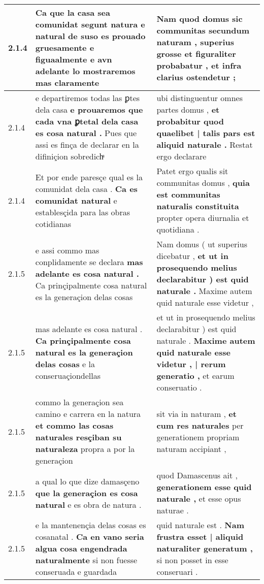\begin{tabular}{|p{1cm}|p{6.5cm}|p{6.5cm}|}
2.1.4 & Ca que la casa sea comunidat \textbf{ segunt natura e natural de suso es prouado gruesamente e figuaalmente } e avn adelante lo mostraremos mas claramente & Nam quod domus sic communitas secundum naturam , \textbf{ superius grosse et figuraliter probabatur , } et infra clarius ostendetur ; \\\hline
2.1.4 & e departiremos todas las ꝑtes dela casa \textbf{ e prouaremos que cada vna ꝑtetal dela casa es cosa natural . } Pues que assi es finça de declarar en la difiniçion sobredichͣ & ubi distinguentur omnes partes domus , \textbf{ et probabitur quod quaelibet | talis pars est aliquid naturale . } Restat ergo declarare \\\hline
2.1.4 & Et por ende paresçe qual es la comunidat dela casa . \textbf{ Ca es comunidat natural } e establesçida para las obras cotidianas & Patet ergo qualis sit communitas domus , \textbf{ quia est communitas naturalis constituita } propter opera diurnalia et quotidiana . \\\hline
2.1.5 & e assi commo mas conplidamente se declara \textbf{ mas adelante es cosa natural . } Ca prinçipalmente cosa natural es la generaçion delas cosas & Nam domus ( ut superius dicebatur , \textbf{ et ut in prosequendo melius declarabitur ) est quid naturale . } Maxime autem quid naturale esse videtur , \\\hline
2.1.5 & mas adelante es cosa natural . \textbf{ Ca prinçipalmente cosa natural es la generaçion delas cosas } e la conseruaçiondellas & et ut in prosequendo melius declarabitur ) est quid naturale . \textbf{ Maxime autem quid naturale esse videtur , | rerum generatio , } et earum conseruatio . \\\hline
2.1.5 & commo la generaçion sea camino e carrera en la natura \textbf{ et commo las cosas naturales resçiban su naturaleza } propra a por la generaçion & sit via in naturam , \textbf{ et cum res naturales } per generationem propriam naturam accipiant , \\\hline
2.1.5 & a qual lo que dize damasçeno \textbf{ que la generaçion es cosa natural } e es obra de natura . & quod Damascenus ait , \textbf{ generationem esse quid naturale , } et esse opus naturae . \\\hline
2.1.5 & e la mantenençia delas cosas es cosanatal . \textbf{ Ca en vano seria algua cosa engendrada naturalmente } si non fuesse conseruada e guardada & quid naturale est . \textbf{ Nam frustra esset | aliquid naturaliter generatum , } si non posset in esse conseruari . \\\hline

\end{tabular}
